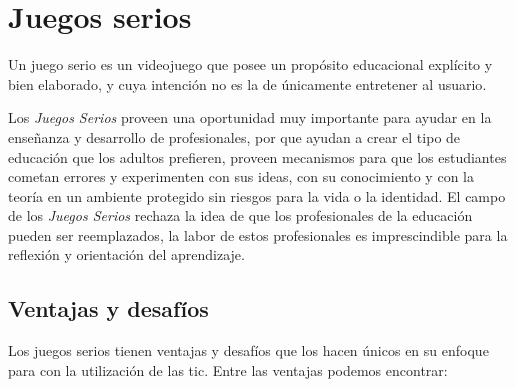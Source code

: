 
\section{Juegos serios}

Un juego serio es un videojuego que posee un propósito educacional explícito y
bien elaborado, y cuya intención no es la de únicamente entretener al
usuario\cite{abt1987serious,sg:aoverview,damien:sg}.

Los \emph{Juegos Serios} proveen una oportunidad muy importante para ayudar en
la enseñanza y desarrollo de profesionales\cite{mariluz:seiousgames}, por que
ayudan a crear el tipo de educación que los adultos prefieren, proveen
mecanismos para que los estudiantes cometan errores y experimenten con sus
ideas, con su conocimiento y con la teoría en un ambiente protegido sin riesgos
para la vida o la identidad\cite{sg:aoverview}. El campo de los \emph{Juegos
    Serios} rechaza la idea de que los profesionales de la educación pueden ser
reemplazados, la labor de estos profesionales es imprescindible para la
reflexión y orientación del aprendizaje\cite{elearning:seiousgames}.

\subsection{Ventajas y desafíos}

Los juegos serios tienen ventajas y desafíos que los hacen únicos en su enfoque
para con la utilización de las \gls{tic}. Entre las ventajas podemos encontrar:


